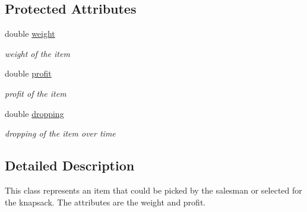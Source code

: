 \subsection*{Protected Attributes}
\begin{DoxyCompactItemize}
\item 
\hypertarget{classcom_1_1msu_1_1thief_1_1model_1_1Item_a2a6b0a03bfff2ac46c09d972a52a063e}{double \hyperlink{classcom_1_1msu_1_1thief_1_1model_1_1Item_a2a6b0a03bfff2ac46c09d972a52a063e}{weight}}\label{classcom_1_1msu_1_1thief_1_1model_1_1Item_a2a6b0a03bfff2ac46c09d972a52a063e}

\begin{DoxyCompactList}\small\item\em weight of the item \end{DoxyCompactList}\item 
\hypertarget{classcom_1_1msu_1_1thief_1_1model_1_1Item_a540f0be6af9387af62bf43bf2930a4da}{double \hyperlink{classcom_1_1msu_1_1thief_1_1model_1_1Item_a540f0be6af9387af62bf43bf2930a4da}{profit}}\label{classcom_1_1msu_1_1thief_1_1model_1_1Item_a540f0be6af9387af62bf43bf2930a4da}

\begin{DoxyCompactList}\small\item\em profit of the item \end{DoxyCompactList}\item 
\hypertarget{classcom_1_1msu_1_1thief_1_1model_1_1Item_acdbd5c173fae33c3f321caeed8a373df}{double \hyperlink{classcom_1_1msu_1_1thief_1_1model_1_1Item_acdbd5c173fae33c3f321caeed8a373df}{dropping}}\label{classcom_1_1msu_1_1thief_1_1model_1_1Item_acdbd5c173fae33c3f321caeed8a373df}

\begin{DoxyCompactList}\small\item\em dropping of the item over time \end{DoxyCompactList}\end{DoxyCompactItemize}


\subsection{Detailed Description}
This class represents an item that could be picked by the salesman or selected for the knapsack. The attributes are the weight and profit. 

